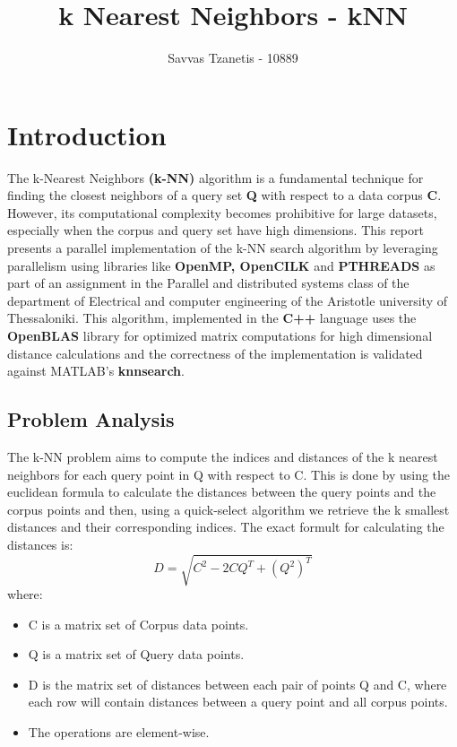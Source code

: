 \documentclass[12pt]{report}
\begin{document}
\title{\textbf{k Nearest Neighbors - kNN}}
\author{Savvas Tzanetis - 10889}
\maketitle  %

\tableofcontents  %

\chapter{Introduction}
    The k-Nearest Neighbors \textbf{(k-NN)} algorithm is a fundamental technique for finding the closest neighbors of a query set \textbf{Q} with respect to a data corpus \textbf{C}. However, its computational complexity becomes prohibitive for large datasets, especially when the corpus and query set have high dimensions. This report presents a parallel implementation of the k-NN search algorithm by leveraging parallelism using libraries like \textbf{OpenMP, OpenCILK} and \textbf{PTHREADS} as part of an assignment in the Parallel and distributed systems class of the department of Electrical and computer engineering of the Aristotle university of Thessaloniki. This algorithm, implemented in the \textbf{C++} language uses the \textbf{OpenBLAS} library for optimized matrix computations for high dimensional distance calculations and the correctness of the implementation is validated against MATLAB's \textbf{knnsearch}.

\section{Problem Analysis}
    The k-NN problem aims to compute the indices and distances of the k nearest neighbors for each query point in Q with respect to C. This is done by using the euclidean formula to calculate the distances between the query points and the corpus points and then, using a quick-select algorithm we retrieve the k smallest distances and their corresponding indices.
    The exact formult for calculating the distances is:
\[
D = \sqrt{C^2 - 2CQ^T + (Q^2)^T}
\]
    where:
\begin{itemize}
    \item C is a matrix set of Corpus data points.
    \item Q is a matrix set of Query data points.
    \item D is the matrix set of distances between each pair of points Q and C, where each row will contain         distances between a query point and all corpus points.
    \item The operations are element-wise.
\end{itemize}
\end{document}
